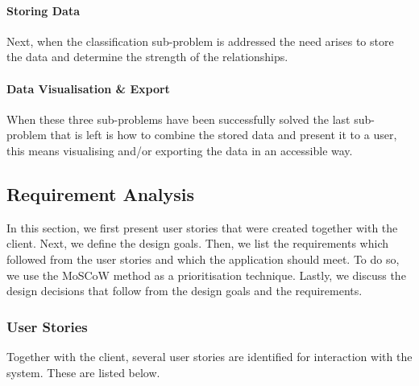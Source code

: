 \paragraph{Storing Data}
Next, when the classification sub-problem is addressed the need arises to store the data and determine the strength of the relationships. 

\paragraph{Data Visualisation \& Export}
When these three sub-problems have been successfully solved the last sub-problem that is left is how to combine the stored data and present it to a user, this means visualising and/or exporting the data in an accessible way.

\subsection{Requirement Analysis}\label{sec:reqs-analysis}
In this section, we first present user stories that were created together with the client. Next, we define the design goals. Then, we list the requirements which followed from the user stories and which the application should meet. To do so, we use the MoSCoW method\cite{clegg1994case} as a prioritisation technique. Lastly, we discuss the design decisions that follow from the design goals and the requirements.

\subsubsection{User Stories}
Together with the client, several user stories are identified for interaction with the system. These are listed below.

